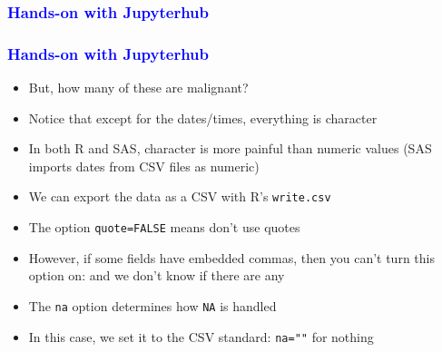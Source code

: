 \documentclass[11pt,pdftex,dvipsnames,usenames]{beamer}
\begin{document}
\begin{frame}[fragile]\frametitle{\bf\textcolor{blue}{Hands-on with Jupyterhub}}

\end{frame}

\begin{frame}[fragile]\frametitle{\bf\textcolor{blue}{Hands-on with Jupyterhub}}
\begin{itemize}
\item But, how many of these are malignant?
\item Notice that except for the dates/times,
everything is character
\item In both R and SAS, character is more painful than numeric
values (SAS imports dates from CSV files as numeric)
\item We can export the data as a CSV with R's \texttt{write.csv}
\item The option \texttt{quote=FALSE} means don't use quotes
\item However, if some fields have embedded commas, then you
can't turn this option on: and we don't know if there are any
\item The \texttt{na} option determines how \texttt{NA} is handled
\item In this case, we set it to the CSV standard: \texttt{na=""}
for nothing 
\end{itemize}

\end{frame}
\end{document}
